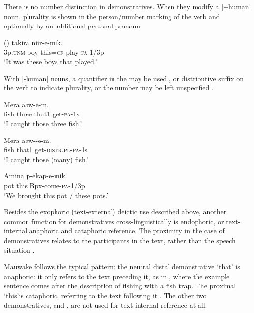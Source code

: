 There is no number distinction in demonstratives. When they modify a [+human] noun, plurality is shown in the person/number marking of the verb and optionally by an additional personal pronoun.

\ea%
\label{ex:3:x635}
\gll () takira  niir-e-mik. \\
3p.\textsc{unm} boy this=\textsc{cf} play-\textsc{pa}-1/3p\\
\glt`It was these boys that played.'
\z

With [-human] nouns, a quantifier in the  may be used , or distributive suffix on the verb  to indicate plurality, or the number may be left unspecified .

\ea%
\label{ex:3:x636}
\gll Mera   aaw-e-m. \\
fish three that1 get-\textsc{pa}-1s\\
\glt`I caught those three fish.'
\z

\ea%
\label{ex:3:x637}
\gll Mera  aaw--e-m. \\
fish that1 get-\textsc{distr}.\textsc{pl}-\textsc{pa}-1s\\
\glt`I caught those (many) fish.'
\z

\ea%
\label{ex:3:x638}
\gll Amina  p-ekap-e-mik. \\
pot this Bpx-come-\textsc{pa}-1/3p\\
\glt`We brought this pot / these pots.'
\z

Besides the exophoric (text-external) deictic use described above, another common function for demonstratives cross-linguistically is endophoric, or text-internal anaphoric and cataphoric reference. The proximity in the case of demonstratives relates to the participants in the text, rather than the speech situation \citep[278]{Lyons1968}. 

Mauwake follows the typical pattern: the neutral distal demonstrative  `that' is anaphoric: it only refers to the text preceding it, as in , where the example sentence comes after the description of fishing with a fish trap. The proximal  `this'is cataphoric, referring to the text following it . The other two demonstratives,  and , are not used for text-internal reference at all.

